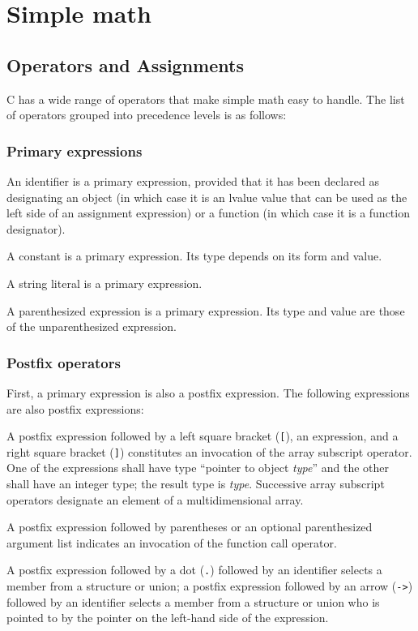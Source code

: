 \section{Simple math}
\subsection{Operators and Assignments}
C has a wide range of operators that make simple math easy to handle. The list
of operators grouped into precedence levels is as follows:

\subsubsection{Primary expressions}
An identifier is a primary expression, provided that it has been declared as
designating an object (in which case it is an lvalue value that can be used as
the left side of an assignment expression) or a function (in which case it is a
function designator).

A constant is a primary expression. Its type depends on its form and value.

A string literal is a primary expression.

A parenthesized expression is a primary expression. Its type and value are
those of the unparenthesized expression.

\subsubsection{Postfix operators}
First, a primary expression is also a postfix expression. The following
expressions are also postfix expressions:

A postfix expression followed by a left square bracket (\texttt{[}), an
expression, and a right square bracket (\texttt{]}) constitutes an invocation
of the array subscript operator. One of the expressions shall have type
``pointer to object \emph{type}'' and the other shall have an integer type; the
result type is \emph{type}. Successive array subscript operators designate an
element of a multidimensional array.

A postfix expression followed by parentheses or an optional parenthesized
argument list indicates an invocation of the function call operator.

A postfix expression followed by a dot (\texttt{.}) followed by an identifier
selects a member from a structure or union; a postfix expression followed by an
arrow (\texttt{-\textgreater{}}) followed by an identifier selects a member
from a structure or union who is pointed to by the pointer on the left-hand
side of the expression.

